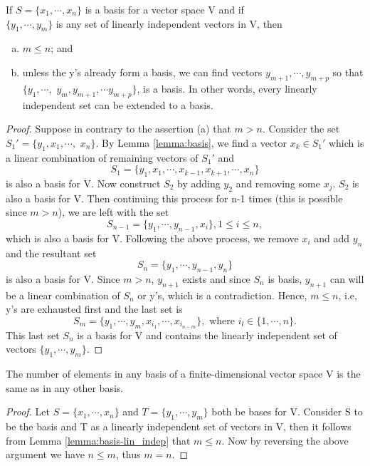 \documentclass[11pt,a4paper]{article}
\begin{document}
\begin{lemma}\label{lemma:basis-lin_indep}
    If $S = \{x_1,\cdots,x_n\}$ is a basis for a vector space V and if \\$\{y_1,\cdots, y_m\}$ is any set of linearly independent vectors in V, then \begin{enumerate}[(a)]
        \item $m\le n$; and
        \item unless the y's already form a basis, we can find vectors $y_{m+1}, \cdots, y_{m+p}$ so that $\{y_1,\cdots,$ $y_m,y_{m+1},\cdots y_{m+p}\}$, is a basis. In other words, every linearly independent set can be extended to a basis.
    \end{enumerate} 
\end{lemma}

\begin{proof}
    Suppose in contrary to the assertion (a) that $m>n$. Consider the set $S_1' = \{y_1,x_1,\cdots,$ $x_n\}$. By Lemma \ref{lemma:basis}, we find a vector $x_k\in S_1'$ which is a linear combination of remaining vectors of $S_1'$ and 
    $$
        S_1 = \{y_1,x_1,\cdots,x_{k-1},x_{k+1},\cdots,x_n\}
    $$
    is also a basis for V. Now construct $S_2$ by adding $y_2$ and removing some $x_j$. $S_2$ is also a basis for V. Then continuing this process for n-1 times (this is possible since $m>n$), we are left with the set 
    $$
        S_{n-1} = \{y_1,\cdots,y_{n-1},x_{i}\},1\le i\le n,
    $$
    which is also a basis for V. Following the above process, we remove $x_i$ and add $y_n$ and the resultant set 
    $$
        S_{n} = \{y_1,\cdots,y_{n-1},y_n\}
    $$
    is also a basis for V. Since $m>n$, $y_{n+1}$ exists and since $S_n$ is basis, $y_{n+1}$ can will be a linear combination of $S_n$ or y's, which is a contradiction. Hence, $m\le n$, i.e, y's are exhausted first and the last set is 
    $$
        S_{m} = \{y_1,\cdots,y_m,x_{i_1},\cdots,x_{i_{n-m}}\},\text{ where }i_l\in\{1,\cdots,n\}.
    $$
    This last set $S_n$ is a basis for V and contains the linearly independent set of vectors $\{y_1,\cdots,y_m\}$.
\end{proof}


\begin{theorem}\label{thm:dimension}
    The number of elements in any basis of a finite-dimensional vector space V is the same as in any other basis.
\end{theorem}

\begin{proof}
    Let $S = \{x_1,\cdots,x_n\}$ and $T = \{y_1,\cdots,y_m\}$ both be bases for V. Consider S to be the basis and T as a linearly independent set of vectors in V, then it follows from Lemma \ref{lemma:basis-lin_indep} that $m\le n$. Now by reversing the above argument we have $n\le m$, thus $m=n$.
\end{proof}
\end{document}
